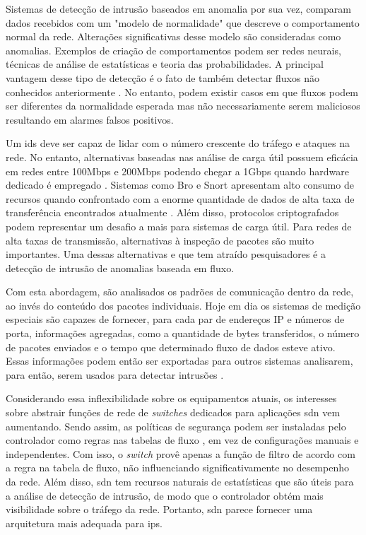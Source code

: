 Sistemas de detecção de intrusão baseados em anomalia por sua vez, comparam dados recebidos com um "modelo de normalidade" que descreve o comportamento normal da rede. Alterações significativas desse modelo são consideradas como anomalias. Exemplos de criação de comportamentos podem ser redes neurais, técnicas de análise de estatísticas e teoria das probabilidades. A principal vantagem desse tipo de detecção é o fato de também detectar fluxos não conhecidos anteriormente \cite{Owezarski:2010}. No entanto, podem existir casos em que fluxos podem ser diferentes da normalidade esperada mas não necessariamente serem maliciosos resultando em alarmes falsos positivos.

Um \gls{ids} deve ser capaz de lidar com o número crescente do tráfego e ataques na rede. No entanto, alternativas baseadas nas análise de carga útil possuem eficácia em redes entre 100Mbps e 200Mbps \cite{Lai:2004, Gao:2006} podendo chegar a 1Gbps quando hardware dedicado é empregado \cite{Vasiliadis:2008}. Sistemas como Bro \cite{Paxson:1999} e Snort \cite{Roesch:1999} apresentam alto consumo de recursos  quando confrontado com a enorme quantidade de dados de alta taxa de transferência encontrados atualmente \cite{Dreger:2004}. Além disso, protocolos criptografados podem representar um desafio a mais para sistemas de carga útil. Para redes de alta taxas de transmissão, alternativas à inspeção de pacotes são muito importantes. Uma dessas alternativas e que tem atraído pesquisadores é a detecção de intrusão de anomalias baseada em fluxo.

Com esta abordagem, são analisados os padrões de comunicação dentro da rede, ao invés do conteúdo dos pacotes individuais. Hoje em dia os sistemas de medição especiais são capazes de fornecer, para cada par de endereços IP e números de porta, informações agregadas, como a quantidade de bytes transferidos, o número de pacotes enviados e o tempo que determinado fluxo de dados esteve ativo. Essas informações podem então ser exportadas para outros sistemas analisarem, para então, serem usados para detectar intrusões \cite{Sperotto:2010}.

Considerando essa inflexibilidade sobre os equipamentos atuais, os interesses sobre abstrair funções de rede de \textit{switches} dedicados para aplicações \gls{sdn} vem aumentando. Sendo assim, as políticas de segurança podem ser instaladas pelo controlador como regras nas tabelas de fluxo \cite{Kim:2013}, em vez de configurações manuais e independentes. Com isso, o \textit{switch} provê apenas a função de filtro de acordo com a regra na tabela de fluxo, não influenciando significativamente no desempenho da rede. Além disso, \gls{sdn} tem recursos naturais de estatísticas que são úteis para a análise de detecção de intrusão, de modo que o controlador obtém mais visibilidade sobre o tráfego da rede. Portanto, \gls{sdn} parece fornecer uma arquitetura mais adequada para \gls{ips}.